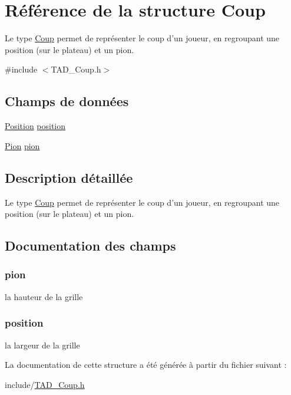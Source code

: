\hypertarget{struct_coup}{\section{Référence de la structure Coup}
\label{struct_coup}
}


Le type \hyperlink{struct_coup}{Coup} permet de représenter le coup d'un joueur, en regroupant une position (sur le plateau) et un pion.  




{\ttfamily \#include $<$T\-A\-D\-\_\-\-Coup.\-h$>$}

\subsection*{Champs de données}
\begin{DoxyCompactItemize}
\item 
\hyperlink{struct_position}{Position} \hyperlink{struct_coup_a4d84949a19a29d3bb4dd2635c8241a83}{position}
\item 
\hyperlink{struct_pion}{Pion} \hyperlink{struct_coup_ad71b3ad38e648f9979a7e37f3ac0c258}{pion}
\end{DoxyCompactItemize}


\subsection{Description détaillée}
Le type \hyperlink{struct_coup}{Coup} permet de représenter le coup d'un joueur, en regroupant une position (sur le plateau) et un pion. 

\subsection{Documentation des champs}
\hypertarget{struct_coup_ad71b3ad38e648f9979a7e37f3ac0c258}{
\subsubsection[{pion}]{ pion}}\label{struct_coup_ad71b3ad38e648f9979a7e37f3ac0c258}
la hauteur de la grille \hypertarget{struct_coup_a4d84949a19a29d3bb4dd2635c8241a83}{
\subsubsection[{position}]{ position}}\label{struct_coup_a4d84949a19a29d3bb4dd2635c8241a83}
la largeur de la grille 

La documentation de cette structure a été générée à partir du fichier suivant \-:\begin{DoxyCompactItemize}
\item 
include/\hyperlink{_t_a_d___coup_8h}{T\-A\-D\-\_\-\-Coup.\-h}\end{DoxyCompactItemize}
